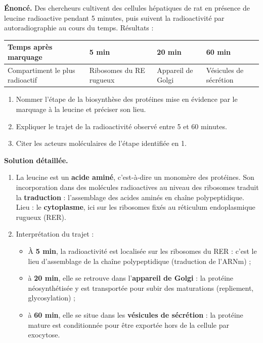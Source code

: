 \documentclass[11pt]{article}
\begin{document}
\begin{exoresolu}
\textbf{Énoncé.} Des chercheurs cultivent des cellules hépatiques de rat en présence de leucine radioactive pendant 5 minutes, puis suivent la radioactivité par autoradiographie au cours du temps. Résultats :
\begin{center}
\begin{tabularx}{\linewidth}{|l|X|X|X|}\hline
\rowcolor{popblueL} \textbf{Temps après marquage} & \textbf{5 min} & \textbf{20 min} & \textbf{60 min} \\ \hline
Compartiment le plus radioactif & Ribosomes du RE rugueux & Appareil de Golgi & Vésicules de sécrétion \\ \hline
\end{tabularx}
\end{center}
\begin{enumerate}
\item Nommer l'étape de la biosynthèse des protéines mise en évidence par le marquage à la leucine et préciser son lieu.
\item Expliquer le trajet de la radioactivité observé entre 5 et 60 minutes.
\item Citer les acteurs moléculaires de l'étape identifiée en 1.
\end{enumerate}
\tcblower
\textbf{Solution détaillée.}
\begin{enumerate}
\item La leucine est un \textbf{acide aminé}, c'est-à-dire un monomère des protéines. Son incorporation dans des molécules radioactives au niveau des ribosomes traduit la \textbf{traduction} : l'assemblage des acides aminés en chaîne polypeptidique. Lieu : le \textbf{cytoplasme}, ici sur les ribosomes fixés au réticulum endoplasmique rugueux (RER).
\item Interprétation du trajet :
\begin{itemize}
\item À \textbf{5 min}, la radioactivité est localisée sur les ribosomes du RER : c'est le lieu d'assemblage de la chaîne polypeptidique (traduction de l'ARNm) ;
\item à \textbf{20 min}, elle se retrouve dans l'\textbf{appareil de Golgi} : la protéine néosynthétisée y est transportée pour subir des maturations (repliement, glycosylation) ;
\item à \textbf{60 min}, elle se situe dans les \textbf{vésicules de sécrétion} : la protéine mature est conditionnée pour être exportée hors de la cellule par exocytose.

\end{itemize}
\end{enumerate}
\end{exoresolu}
\end{document}
